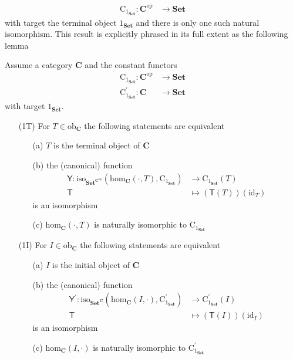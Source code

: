 \begin{align*}
  \mathrm{C}_{1_{\mathbf{Set}}}
  \colon
  \mathbf{C}^{\mathrm{op}}
  &\rightarrow
  \mathbf{Set}
\end{align*}
with target the terminal object $1_{\mathbf{Set}}$ and there is only one such natural isomorphism. This result is explicitly phrased in its full extent as the following lemma 
\\
\begin{lem}
\label{lem:repuniob}
Assume a category $\mathbf{C}$ and the constant functors
\begin{align*}
  \mathrm{C}_{1_{\mathbf{Set}}}
  \colon
  \mathbf{C}^{\mathrm{op}}
  &\rightarrow
  \mathbf{Set}
  \\
  \mathrm{C}_{1_{\mathbf{Set}}}^{\prime}
  \colon
  \mathbf{C}
  &\rightarrow
  \mathbf{Set}
\end{align*}
with target $1_{\mathbf{Set}}$.
\begin{enumerate}
\item[(1T)]
For $T \in \mathrm{ob}_{\mathbf{C}}$ the following statements are equivalent
\begin{enumerate}
\item[(a)]
$T$ is the terminal object of $\mathbf{C}$
\item[(b)]
the (canonical) function
\begin{align*}
  \mathsf{Y}
  \colon
  \mathrm{iso}_{\mathbf{Set}^{\mathbf{C}^{\mathrm{op}}}}
  \left(
    \mathrm{hom}_{\mathbf{C}}(\cdot,T),
    \mathrm{C}_{1_{\mathbf{Set}}}
  \right)
  &\rightarrow
  \mathrm{C}_{1_{\mathbf{Set}}}(T)
  \\
  \mathsf{T}
  &\mapsto
  (\mathsf{T}(T))(\mathrm{id}_{T})
\end{align*}
is an isomorphism
\item[(c)]
$\mathrm{hom}_{\mathbf{C}}(\cdot,T)$ is naturally isomorphic to $\mathrm{C}_{1_{\mathbf{Set}}}$
\end{enumerate}
\item[(1I)]
For $I \in \mathrm{ob}_{\mathbf{C}}$ the following statements are equivalent
\begin{enumerate}
\item[(a)]
$I$ is the initial object of $\mathbf{C}$
\item[(b)]
the (canonical) function
\begin{align*}
  \mathsf{Y}^{\prime}
  \colon
  \mathrm{iso}_{\mathbf{Set}^{\mathbf{C}}}
  \left(
    \mathrm{hom}_{\mathbf{C}}(I,\cdot),
    \mathrm{C}_{1_{\mathbf{Set}}}^{\prime}
  \right)
  &\rightarrow
  \mathrm{C}_{1_{\mathbf{Set}}}^{\prime}(I)
  \\
  \mathsf{T}
  &\mapsto
  (\mathsf{T}(I))(\mathrm{id}_{I})
\end{align*}
is an isomorphism
\item[(c)]
$\mathrm{hom}_{\mathbf{C}}(I,\cdot)$ is naturally isomorphic to $\mathrm{C}_{1_{\mathbf{Set}}}^{\prime}$
\end{enumerate}
\end{enumerate}
\end{lem}
